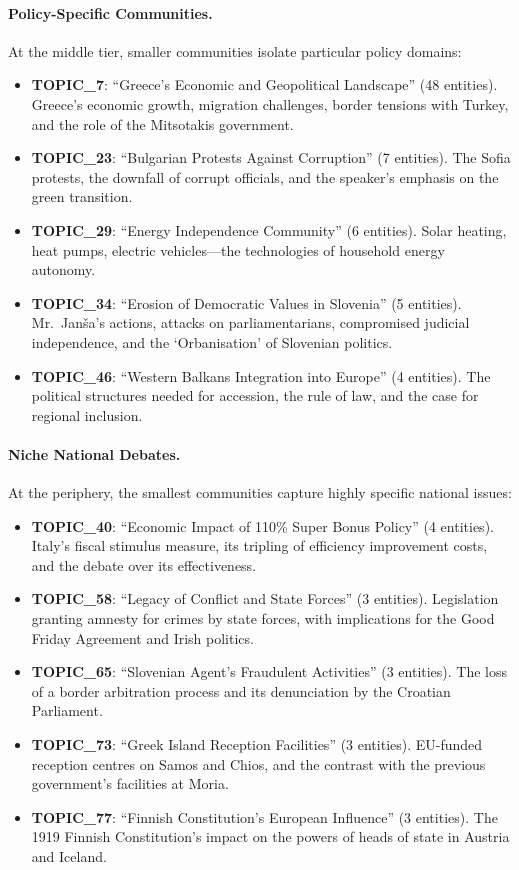 \documentclass[11pt]{article}
\begin{document}
\paragraph{Policy-Specific Communities.}

At the middle tier, smaller communities isolate particular policy domains:

\begin{itemize}
  \item \textbf{TOPIC\_7}: ``Greece's Economic and Geopolitical Landscape'' (48 entities). Greece's economic growth, migration challenges, border tensions with Turkey, and the role of the Mitsotakis government.
  \item \textbf{TOPIC\_23}: ``Bulgarian Protests Against Corruption'' (7 entities). The Sofia protests, the downfall of corrupt officials, and the speaker's emphasis on the green transition.
  \item \textbf{TOPIC\_29}: ``Energy Independence Community'' (6 entities). Solar heating, heat pumps, electric vehicles---the technologies of household energy autonomy.
  \item \textbf{TOPIC\_34}: ``Erosion of Democratic Values in Slovenia'' (5 entities). Mr.\ Jan\v{s}a's actions, attacks on parliamentarians, compromised judicial independence, and the `Orbanisation' of Slovenian politics.
  \item \textbf{TOPIC\_46}: ``Western Balkans Integration into Europe'' (4 entities). The political structures needed for accession, the rule of law, and the case for regional inclusion.
\end{itemize}

\paragraph{Niche National Debates.}

At the periphery, the smallest communities capture highly specific national issues:

\begin{itemize}
  \item \textbf{TOPIC\_40}: ``Economic Impact of 110\% Super Bonus Policy'' (4 entities). Italy's fiscal stimulus measure, its tripling of efficiency improvement costs, and the debate over its effectiveness.
  \item \textbf{TOPIC\_58}: ``Legacy of Conflict and State Forces'' (3 entities). Legislation granting amnesty for crimes by state forces, with implications for the Good Friday Agreement and Irish politics.
  \item \textbf{TOPIC\_65}: ``Slovenian Agent's Fraudulent Activities'' (3 entities). The loss of a border arbitration process and its denunciation by the Croatian Parliament.
  \item \textbf{TOPIC\_73}: ``Greek Island Reception Facilities'' (3 entities). EU-funded reception centres on Samos and Chios, and the contrast with the previous government's facilities at Moria.
  \item \textbf{TOPIC\_77}: ``Finnish Constitution's European Influence'' (3 entities). The 1919 Finnish Constitution's impact on the powers of heads of state in Austria and Iceland.
\end{itemize}
\end{document}
